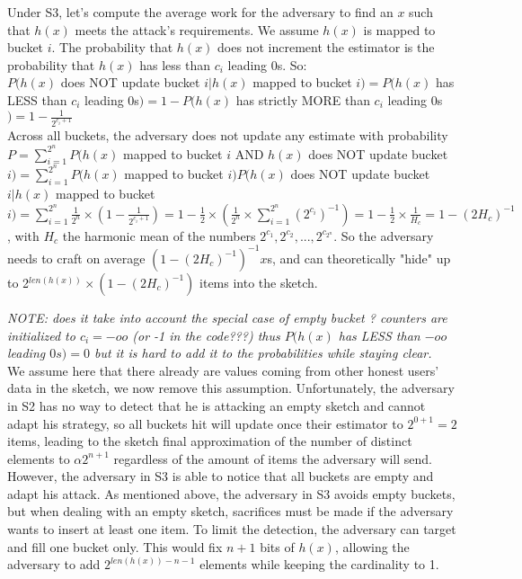 \documentclass{IEEEtran}
\begin{document}
Under S3, let's compute the average work for the adversary to find an $x$ such that $h(x)$ meets the attack's requirements. We assume $h(x)$ is mapped to bucket $i$. The probability that $h(x)$ does not increment the estimator is the probability that $h(x)$ has less than $c_i$ leading 0s. So:\\
$P(h(x)$ does NOT update bucket $i| h(x)$ mapped to bucket $i)=P(h(x)$ has LESS than $c_i$ leading 0s$)=1-P(h(x)$ has strictly MORE than $c_i$ leading 0s$)=1-\frac{1}{2^{c_i+1}}$\\
Across all buckets, the adversary does not update any estimate with probability $P=
\sum_{i=1}^{2^n}P(h(x)$ mapped to bucket $i$ AND $h(x)$ does NOT update bucket $i) = \sum_{i=1}^{2^n}P(h(x)$ mapped to bucket $i)P(h(x)$ does NOT update bucket $i| h(x)$ mapped to bucket $i) = \sum_{i=1}^{2^n}\frac{1}{2^n} \times (1-\frac{1}{2^{c_i+1}}) = 1-\frac{1}{2}\times(\frac{1}{2^n}\times \sum_{i=1}^{2^n} {(2^{c_i})}^{-1}) = 1-\frac{1}{2}\times\frac{1}{H_c} = 1-(2H_c)^{-1}$, with $H_c$ the harmonic mean of the numbers $2^{c_1}, 2^{c_2}, ..., 2^{c_{2^n}}$.
So the adversary needs to craft on average $(1-(2H_c)^{-1})^{-1} x$s, and can theoretically "hide" up to 2$^{len(h(x))}\times (1-(2H_c)^{-1})$ items into the sketch.

\textit{NOTE: does it take into account the special case of empty bucket ? counters are initialized to $c_i=-oo$ (or -1 in the code???) thus $P(h(x)$ has LESS than $-oo$ leading $0s) = 0$ but it is hard to add it to the probabilities while staying clear.}\\

We assume here that there already are values coming from other honest users' data in the sketch, we now remove this assumption. Unfortunately, the adversary in S2 has no way to detect that he is attacking an empty sketch and cannot adapt his strategy, so all buckets hit will update once their estimator to $2^{0+1}=2$ items, leading to the sketch final approximation of the number of distinct elements to $\alpha2^{n+1}$ regardless of the amount of items the adversary will send. However, the adversary in S3 is able to notice that all buckets are empty and adapt his attack. As mentioned above, the adversary in S3 avoids empty buckets, but when dealing with an empty sketch, sacrifices must be made if the adversary wants to insert at least one item. To limit the detection, the adversary can target and fill one bucket only. This would fix $n+1$ bits of $h(x)$, allowing the adversary to add $2^{len(h(x))-n-1}$ elements while keeping the cardinality to 1.
\end{document}
